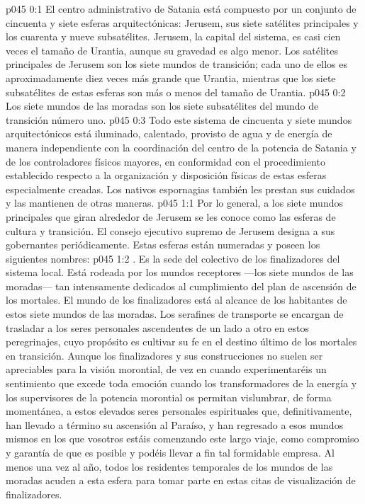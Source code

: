 \author{Melquisedec}
\vs p045 0:1 El centro administrativo de Satania está compuesto por un conjunto de cincuenta y siete esferas arquitectónicas: Jerusem, sus siete satélites principales y los cuarenta y nueve subsatélites. Jerusem, la capital del sistema, es casi cien veces el tamaño de Urantia, aunque su gravedad es algo menor. Los satélites principales de Jerusem son los siete mundos de transición; cada uno de ellos es aproximadamente diez veces más grande que Urantia, mientras que los siete subsatélites de estas esferas son más o menos del tamaño de Urantia.
\vs p045 0:2 Los siete mundos de las moradas son los siete subsatélites del mundo de transición número uno.
\vs p045 0:3 Todo este sistema de cincuenta y siete mundos arquitectónicos está iluminado, calentado, provisto de agua y de energía de manera independiente con la coordinación del centro de la potencia de Satania y de los controladores físicos mayores, en conformidad con el procedimiento establecido respecto a la organización y disposición físicas de estas esferas especialmente creadas. Los nativos espornagias también les prestan sus cuidados y las mantienen de otras maneras.
\vs p045 1:1 Por lo general, a los siete mundos principales que giran alrededor de Jerusem se les conoce como las esferas de cultura y transición. El consejo ejecutivo supremo de Jerusem designa a sus gobernantes periódicamente. Estas esferas están numeradas y poseen los siguientes nombres:
\vs p045 1:2 \pc {}. Es la sede del colectivo de los finalizadores del sistema local. Está rodeada por los mundos receptores ---los siete mundos de las moradas--- tan intensamente dedicados al cumplimiento del plan de ascensión de los mortales. El mundo de los finalizadores está al alcance de los habitantes de estos siete mundos de las moradas. Los serafines de transporte se encargan de trasladar a los seres personales ascendentes de un lado a otro en estos peregrinajes, cuyo propósito es cultivar su fe en el destino último de los mortales en transición. Aunque los finalizadores y sus construcciones no suelen ser apreciables para la visión morontial, de vez en cuando experimentaréis un sentimiento que excede toda emoción cuando los transformadores de la energía y los supervisores de la potencia morontial os permitan vislumbrar, de forma momentánea, a estos elevados seres personales espirituales que, definitivamente, han llevado a término su ascensión al Paraíso, y han regresado a esos mundos mismos en los que vosotros estáis comenzando este largo viaje, como compromiso y garantía de que es posible y podéis llevar a fin tal formidable empresa. Al menos una vez al año, todos los residentes temporales de los mundos de las moradas acuden a esta esfera para tomar parte en estas citas de visualización de finalizadores.
